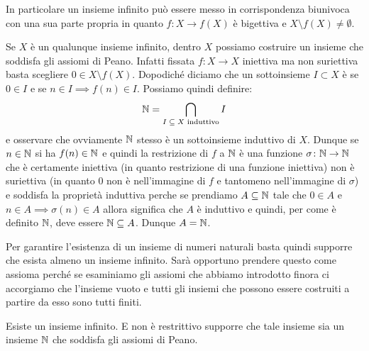 In particolare un insieme infinito 
può essere messo in corrispondenza biunivoca
con una sua parte propria 
in quanto $f\colon X \to f(X)$ è bigettiva
e $X\setminus f(X)\neq \emptyset$.

Se $X$ è un qualunque insieme infinito, dentro $X$ 
possiamo costruire un insieme che soddisfa gli assiomi di Peano.
Infatti fissata $f\colon X\to X$ iniettiva ma non suriettiva 
basta scegliere $0\in X\setminus f(X)$. 
Dopodiché diciamo che un sottoinsieme $I\subset X$ è 
se $0\in I$ e se $n\in I\implies f(n)\in I$. Possiamo quindi definire:
\[
  \mathbb N = \bigcap_{\text{$I\subseteq X$ induttivo}} I
\]
e osservare che ovviamente $\mathbb N$ stesso è un sottoinsieme induttivo di $X$.
Dunque se $n\in \mathbb N$ si ha $f(n)\in \mathbb N$ e quindi la 
restrizione di $f$ a $\mathbb N$ è una funzione $\sigma\colon \mathbb N\to\mathbb N$ 
che è certamente iniettiva (in quanto restrizione di una funzione iniettiva)
non è suriettiva (in quanto $0$ non è nell'immagine di $f$ 
e tantomeno nell'immagine di $\sigma$) e soddisfa la proprietà induttiva 
perche se prendiamo $A\subseteq \mathbb N$ tale che $0\in A$ e $n\in A \implies \sigma(n) \in A$ 
allora significa che $A$ è induttivo e quindi, per come è definito $\mathbb N$,
deve essere $\mathbb N\subseteq A$. Dunque $A=\mathbb N$.

Per garantire l'esistenza di un insieme di numeri naturali basta quindi 
supporre che esista almeno un insieme infinito.
Sarà opportuno prendere questo come assioma perché se esaminiamo 
gli assiomi che abbiamo introdotto finora 
ci accorgiamo che l'insieme vuoto e tutti gli insiemi che possono 
essere costruiti a partire da esso sono tutti finiti.

\begin{axiom}[infinito]
\label{axiom:infinito}%
Esiste un insieme infinito. 
E non è restrittivo supporre che tale insieme sia un insieme $\mathbb N$ 
che soddisfa gli assiomi di Peano. 
\end{axiom}

\begin{comment} %
  \begin{lemma}
    Per ogni $n\in \NN$ si ha $\sigma(n)\neq n$.
    \end{lemma}
    \begin{proof}
      Lo si dimostra per induzione. Per $n=0$ sappiamo che $\sigma(0)\neq 0$ 
      in quanto zero non è successore di nessun numero naturale.
      Se ora supponiamo di sapere che $\sigma(n)\neq n$ sapendo che 
      $\sigma$ è iniettiva possiamo dedurre $\sigma(\sigma(n))\neq \sigma(n)$ 
      che è proprio il passo induttivo.
  \end{proof}    
  \end{comment}
  
